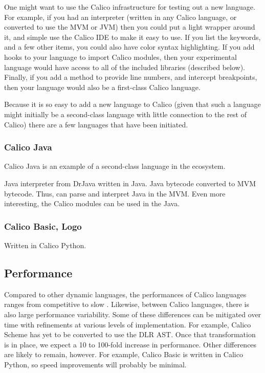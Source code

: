 \documentclass[preprint]{sigplanconf}
\begin{document}
One might want to use the Calico infrastructure for testing out a new
language. For example, if you had an interpreter (written in any
Calico language, or converted to use the MVM or JVM) then you could
put a light wrapper around it, and simple use the Calico IDE to make
it easy to use. If you list the keywords, and a few other items, you
could also have color syntax highlighting. If you add hooks to your
language to import Calico modules, then your experimental language
would have access to all of the included libraries (described
below). Finally, if you add a method to provide line numbers, and
intercept breakpoints, then your language would also be a first-class
Calico language.

Because it is so easy to add a new language to Calico (given that such
a language might initially be a second-class language with little
connection to the rest of Calico) there are a few languages that have
been initiated.

\subsubsection{Calico Java}

Calico Java is an example of a second-class language in the ecosystem.

Java interpreter from DrJava written in Java. Java bytecode converted
to MVM bytecode. Thus, can parse and interpret Java in the MVM. Even
more interesting, the Calico modules can be used in the Java.

\subsubsection{Calico Basic, Logo}

Written in Calico Python. 

\subsection{Performance}

Compared to other dynamic languages, the performances of Calico
languages ranges from competitive to slow
\cite{python-benchmark}. Likewise, between Calico languages, there is
also large performance variability. Some of these differences can be
mitigated over time with refinements at various levels of
implementation. For example, Calico Scheme has yet to be converted to
use the DLR AST. Once that transformation is in place, we expect a 10
to 100-fold increase in performance. Other differences are likely to
remain, however. For example, Calico Basic is written in Calico
Python, so speed improvements will probably be minimal.
\end{document}
